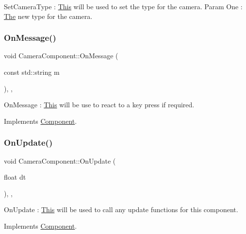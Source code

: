 Set\+Camera\+Type \+: \mbox{\hyperlink{class_this}{This}} will be used to set the type for the camera. Param One \+: \mbox{\hyperlink{class_the}{The}} new type for the camera. \mbox{\label{class_camera_component_a1cd7e6036568be5bf45d249d8f96a596}} 
\subsubsection{\texorpdfstring{On\+Message()}{OnMessage()}}
{\footnotesize\ttfamily void Camera\+Component\+::\+On\+Message (\begin{DoxyParamCaption}\item[{const std\+::string}]{m }\end{DoxyParamCaption})\hspace{0.3cm}{\ttfamily [inline]}, {\ttfamily [override]}, {\ttfamily [virtual]}}

On\+Message \+: \mbox{\hyperlink{class_this}{This}} will be use to react to a key press if required. 

Implements \mbox{\hyperlink{class_component_a1a880fe5e212cd7ef8241e220660417d}{Component}}.

\mbox{\label{class_camera_component_aa0391037fd478ea1a602835ea64091ba}} 
\subsubsection{\texorpdfstring{On\+Update()}{OnUpdate()}}
{\footnotesize\ttfamily void Camera\+Component\+::\+On\+Update (\begin{DoxyParamCaption}\item[{float}]{dt }\end{DoxyParamCaption})\hspace{0.3cm}{\ttfamily [inline]}, {\ttfamily [override]}, {\ttfamily [virtual]}}

On\+Update \+: \mbox{\hyperlink{class_this}{This}} will be used to call any update functions for this component. 

Implements \mbox{\hyperlink{class_component_ab71d7f4b6d8792287a9b0c9e045acbe0}{Component}}.



